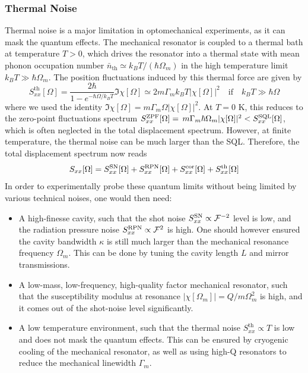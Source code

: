 \subsubsection{Thermal Noise}
Thermal noise is a major limitation in optomechanical experiments, as it can mask the quantum effects. The mechanical resonator is coupled to a thermal bath at temperature $T>0$, which drives the resonator into a thermal state with mean phonon occupation number $\bar n_{\mathrm{th}} \simeq k_B T / (\hbar \Omega_m)$ in the high temperature limit $k_B T \gg \hbar \Omega_m$. The position fluctuations induced by this thermal force are given by
\begin{equation}
  S_{xx}^{\mathrm{th}}[\Omega] = \dfrac{2\hbar}{1 - e^{-\hbar \Omega / k_B T}} \Im \chi[\Omega] \simeq 2 m \Gamma_m k_B T |\chi[\Omega]|^2 \quad \text{if} \quad k_B T \gg \hbar \Omega
\end{equation}
where we used the identity $\Im \chi[\Omega] = m\Gamma_m \Omega |\chi[\Omega]|^2$. At $T=0$ K, this reduces to the zero-point fluctuations spectrum $S_{xx}^{\mathrm{ZPF}}[\Omega] =\, m \Gamma_m \hbar \Omega_m  |\chi[\Omega]|^2 < S_{xx}^{\rm SQL}[\Omega]$, which is often neglected in the total displacement spectrum. However, at finite temperature, the thermal noise can be much larger than the SQL. Therefore, the total displacement spectrum now reads
\begin{equation}
  S_{xx}[\Omega] = S_{xx}^{\rm SN}[\Omega] + S_{xx}^{\rm RPN}[\Omega] + S_{xx}^{\rm cor}[\Omega] + S_{xx}^{\mathrm{th}}[\Omega]
\end{equation}
In order to experimentally probe these quantum limits without being limited by various technical noises, one would then need: 
\begin{itemize}
  \item A high-finesse cavity, such that the shot noise $S_{xx}^{\rm SN} \propto \mathcal{F}^{-2}$ level is low, and the radiation pressure noise $S_{xx}^{\rm RPN} \propto \mathcal{F}^{2}$ is high. One should however ensured the cavity bandwidth $\kappa$ is still much larger than the mechanical resonance frequency $\Omega_m$. This can be done by tuning the cavity length $L$ and mirror transmissions.
  \item A low-mass, low-frequency, high-quality factor mechanical resonator, such that the susceptibility modulus at resonance $|\chi[\Omega_m]|=Q/m \Omega_{m}^2$ is high, and it comes out of the shot-noise level significantly. 
  \item A low temperature environment, such that the thermal noise $S_{xx}^{\mathrm{th}} \propto T$ is low and does not mask the quantum effects. This can be ensured by cryogenic cooling of the mechanical resonator, as well as using high-Q resonators to reduce the mechanical linewidth $\Gamma_m$.
\end{itemize}

